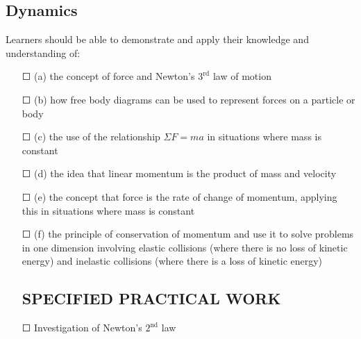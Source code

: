 \subsection{Dynamics}
Learners should be able to demonstrate and apply their knowledge and
understanding of:
\begin{itemize}
	\item[\Large{$\Square$}](a) the concept of force and Newton's \(3^{\text{rd}}\) law of motion
	\item[\Large{$\Square$}](b) how free body diagrams can be used to represent forces on a particle or body
	\item[\Large{$\Square$}](c) the use of the relationship \(\Sigma F = ma\) in situations where mass is constant
	\item[\Large{$\Square$}](d) the idea that linear momentum is the product of mass and velocity
	\item[\Large{$\Square$}](e) the concept that force is the rate of change of momentum, applying this in situations where mass is constant
	\item[\Large{$\Square$}](f) the principle of conservation of momentum and use it to solve problems in one dimension involving \sq elastic collisions (where there is no loss of kinetic
	energy) and \sq inelastic collisions (where there is a loss of kinetic energy)
	\subsection*{SPECIFIED PRACTICAL WORK}
	\item[\Large{$\Square$}]Investigation of Newton’s \(2^{\text{nd}}\) law
\end{itemize}
